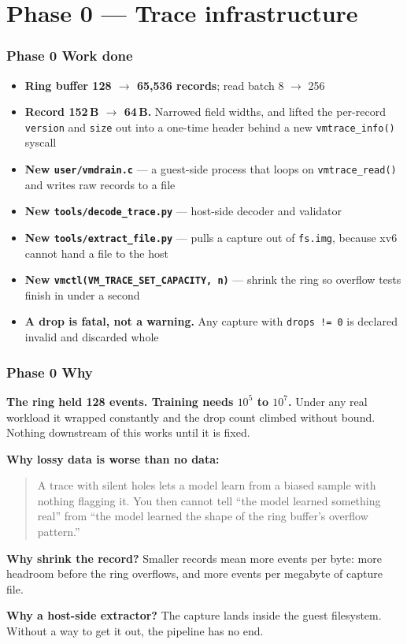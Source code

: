 \documentclass[10pt,aspectratio=169]{beamer}
\newcommand{\phasehead}[2]{%
  \frametitle{#1 \quad\small\normalfont\textcolor{white!75!accent}{#2}}}
\begin{document}

\section{Phase 0 --- Trace infrastructure}

\begin{frame}
  \phasehead{Phase 0}{Work done}
  \small
  \begin{itemize}
    \item \textbf{Ring buffer 128 $\to$ 65{,}536 records}; read batch 8 $\to$ 256
    \item \textbf{Record 152\,B $\to$ 64\,B.} Narrowed field widths, and lifted
          the per-record \texttt{version} and \texttt{size} out into a one-time
          header behind a new \texttt{vmtrace\_info()} syscall
    \item \textbf{New \texttt{user/vmdrain.c}} --- a guest-side process that loops
          on \texttt{vmtrace\_read()} and writes raw records to a file
    \item \textbf{New \texttt{tools/decode\_trace.py}} --- host-side decoder and
          validator
    \item \textbf{New \texttt{tools/extract\_file.py}} --- pulls a capture out of
          \texttt{fs.img}, because xv6 cannot hand a file to the host
    \item \textbf{New \texttt{vmctl(VM\_TRACE\_SET\_CAPACITY, n)}} --- shrink the
          ring so overflow tests finish in under a second
    \item \textbf{A drop is fatal, not a warning.} Any capture with
          \texttt{drops != 0} is declared invalid and discarded whole
  \end{itemize}
\end{frame}

\begin{frame}
  \phasehead{Phase 0}{Why}
  \small
  \textbf{The ring held 128 events. Training needs $10^5$ to $10^7$.} Under any
  real workload it wrapped constantly and the drop count climbed without
  bound. Nothing downstream of this works until it is fixed.

  \medskip
  \textbf{Why lossy data is worse than no data:}
  \begin{quote}
    A trace with silent holes lets a model learn from a biased sample with
    nothing flagging it. You then cannot tell ``the model learned something
    real'' from ``the model learned the shape of the ring buffer's overflow
    pattern.''
  \end{quote}

  \medskip
  \textbf{Why shrink the record?} Smaller records mean more events per byte:
  more headroom before the ring overflows, and more events per megabyte of
  capture file.

  \medskip
  \textbf{Why a host-side extractor?} The capture lands inside the guest
  filesystem. Without a way to get it out, the pipeline has no end.
\end{frame}
\end{document}
